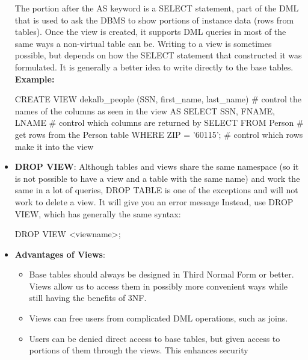\documentclass{report}
\begin{document}
\begin{itemize}
\begin{sqlcode}
                    \end{sqlcode}
                    \bigbreak \noindent 
                    The portion after the AS keyword is a SELECT statement, part of the DML that is used to ask the DBMS to show
                    portions of instance data (rows from tables). 
                    \bigbreak \noindent 
                    Once the view is created, it supports DML queries in most of the same ways a non-virtual table can be. Writing to a
                    view is sometimes possible, but depends on how the SELECT statement that constructed it was formulated. It is
                    generally a better idea to write directly to the base tables.
            \bigbreak \noindent 
            \textbf{Example:}
            \bigbreak \noindent 
            \begin{sqlcode}
                CREATE VIEW dekalb_people
                    (SSN, first_name, last_name) # control the names of the columns as seen in the view
                    AS SELECT SSN, FNAME, LNAME # control which columns are returned by SELECT
                        FROM Person # get rows from the Person table
                        WHERE ZIP = '60115'; # control which rows make it into the view
            \end{sqlcode}
        \item \textbf{DROP VIEW}: Although tables and views share the same namespace (so it is not possible to have a view and a table with the same name) and work the same in a lot of queries, DROP TABLE is one of the exceptions and will not work to delete a view. It will give you an error message
            \bigbreak \noindent 
            Instead, use DROP VIEW, which has generally the same syntax:
            \bigbreak \noindent 
            \begin{sqlcode}
            DROP VIEW <viewname>;
            \end{sqlcode}
        \item \textbf{Advantages of Views}:
            \begin{itemize}
                \item Base tables should always be designed in Third Normal Form or better. Views allow us to access them in possibly more convenient ways while still having the benefits of 3NF.
                \item Views can free users from complicated DML operations, such as joins.
                \item Users can be denied direct access to base tables, but given access to portions of them through the views. This enhances security
            \end{itemize}
    \end{itemize}
\end{document}
